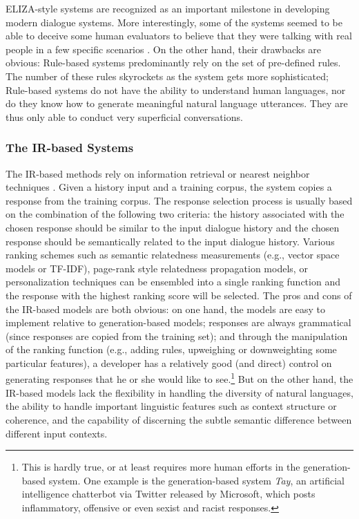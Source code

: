 ELIZA-style systems are recognized as an important milestone in developing modern dialogue systems. 
More interestingly, 
 some of the systems seemed to be able to deceive some human evaluators to believe that they were talking with real people in a few specific scenarios \cite{thomas1995social,colby1972turing,pinar2000turing}.
 On the other hand, their drawbacks are obvious: 
Rule-based systems 
predominantly rely on
 the set of pre-defined rules.  
The number of these rules  skyrockets as the system gets more sophisticated;
Rule-based systems do not have the ability to understand human languages, nor do they know how to generate meaningful natural language utterances.
They are 
 thus only able to conduct very superficial conversations.  


\subsubsection{The IR-based Systems}
The IR-based methods  rely on information retrieval or nearest neighbor techniques  \cite{isbell2000cobot,jafarpour2010filter,yan2016learning,al2016conversational,yan2016docchat}.
Given a history input and a training corpus, the system copies a response from the training corpus.
The response selection process is usually
 based on the 
combination of the following
 two criteria: 
the history associated with the chosen response should be similar to the input dialogue history and the 
chosen response should be semantically related to the input dialogue history. 
Various ranking schemes such as semantic relatedness measurements (e.g., vector space models or TF-IDF), 
page-rank style relatedness propagation models, or personalization 
techniques
can be ensembled into a single ranking function 
and the response with the highest ranking score will be selected. 
The pros and cons of the IR-based models are both obvious: on one hand, the models are easy to implement relative to generation-based models;
responses are always grammatical (since responses are copied from the training set); and through the manipulation of 
the ranking function (e.g., adding rules, upweighing or downweighting some particular features), a developer has a relatively good (and direct) control on generating responses that he or she would like to see.\footnote{This is hardly true, or at least requires more human efforts in the generation-based system. One example is the generation-based system {\it Tay}, an artificial intelligence chatterbot via Twitter released by Microsoft, which posts inflammatory, offensive or even sexist and racist responses.} 
But on the other hand, the IR-based models lack the flexibility in handling the diversity of natural languages, the ability to handle important linguistic features such as 
context structure or coherence, 
and the capability of discerning 
 the subtle semantic difference between different input contexts. 
